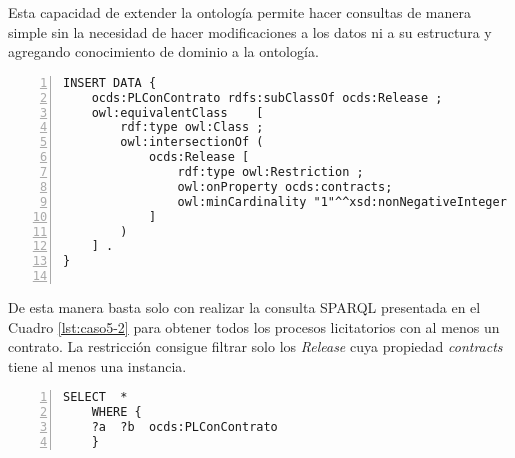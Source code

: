 Esta capacidad de extender la ontología permite hacer consultas de manera simple sin la necesidad de hacer modificaciones a los datos ni a su estructura y agregando conocimiento de dominio a la ontología.

\hfill \break


\noindent\begin{minipage}[c]{\textwidth}
\begin{lstlisting}[captionpos=b, caption=Extensión de la ontología utilizando restricciones ontológicas, label={lst:caso5-1},  numbers=left,  numberstyle=\tiny\color{mygray},frame=single]
INSERT DATA {
    ocds:PLConContrato rdfs:subClassOf ocds:Release ; 
    owl:equivalentClass    [ 
        rdf:type owl:Class ;
        owl:intersectionOf (   
            ocds:Release [ 
                rdf:type owl:Restriction ;
                owl:onProperty ocds:contracts; 
                owl:minCardinality "1"^^xsd:nonNegativeInteger ;
            ] 
        )
    ] .
}
    
 \end{lstlisting}
\end{minipage}
 De esta manera basta solo con realizar la consulta SPARQL presentada en el Cuadro \ref{lst:caso5-2} para obtener todos los procesos licitatorios con al menos un contrato. La restricción consigue filtrar solo los \textit{Release} cuya propiedad \textit{contracts} tiene al menos una instancia.\hfill \break

\noindent\begin{minipage}[c]{\textwidth}
 \begin{lstlisting}[captionpos=b, caption=Consulta SPARQL utilizando la Clase PLConContrato, label=lst:caso5-2,  numbers=left,  numberstyle=\tiny\color{mygray},frame=single]
SELECT  *
    WHERE { 
    ?a  ?b  ocds:PLConContrato 
    }
 \end{lstlisting}
\end{minipage}
 